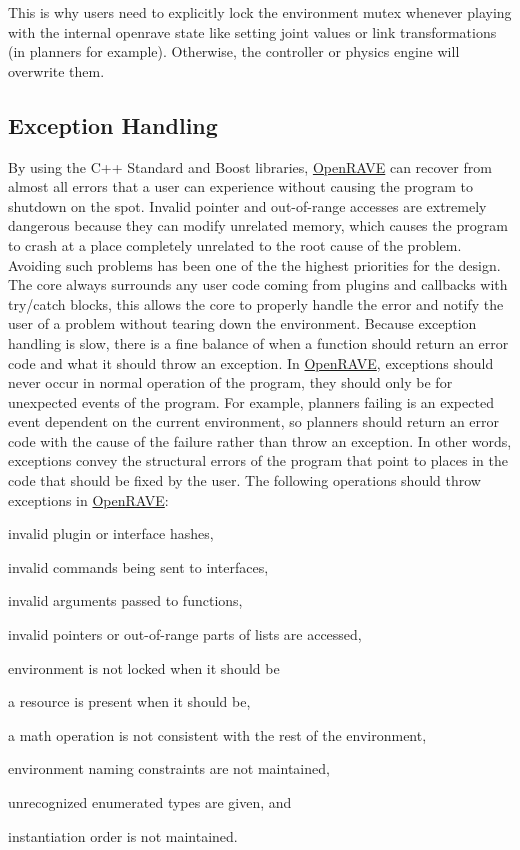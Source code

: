 This is why users need to explicitly lock the environment mutex whenever playing with the internal openrave state like setting joint values or link transformations (in planners for example). Otherwise, the controller or physics engine will overwrite them.\hypertarget{architecture__concepts_arch_exceptions}{}\subsection{Exception Handling}\label{architecture__concepts_arch_exceptions}
By using the C++ Standard and Boost libraries, \hyperlink{namespaceOpenRAVE}{OpenRAVE} can recover from almost all errors that a user can experience without causing the program to shutdown on the spot. Invalid pointer and out-\/of-\/range accesses are extremely dangerous because they can modify unrelated memory, which causes the program to crash at a place completely unrelated to the root cause of the problem. Avoiding such problems has been one of the the highest priorities for the design. The core always surrounds any user code coming from plugins and callbacks with try/catch blocks, this allows the core to properly handle the error and notify the user of a problem without tearing down the environment. Because exception handling is slow, there is a fine balance of when a function should return an error code and what it should throw an exception. In \hyperlink{namespaceOpenRAVE}{OpenRAVE}, exceptions should never occur in normal operation of the program, they should only be for unexpected events of the program. For example, planners failing is an expected event dependent on the current environment, so planners should return an error code with the cause of the failure rather than throw an exception. In other words, exceptions convey the structural errors of the program that point to places in the code that should be fixed by the user. The following operations should throw exceptions in \hyperlink{namespaceOpenRAVE}{OpenRAVE}:


\begin{DoxyItemize}
\item invalid plugin or interface hashes,
\item invalid commands being sent to interfaces,
\item invalid arguments passed to functions,
\item invalid pointers or out-\/of-\/range parts of lists are accessed,
\item environment is not locked when it should be
\item a resource is present when it should be,
\item a math operation is not consistent with the rest of the environment,
\item environment naming constraints are not maintained,
\item unrecognized enumerated types are given, and
\item instantiation order is not maintained.
\end{DoxyItemize}

